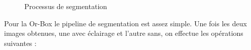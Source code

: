 \begin{figure}[H]
{        \label{Segmentation_Dilatation}
    }
    \caption{Processus de segmentation}
    \label{segfig}
\end{figure}

Pour la Or-Box le pipeline de segmentation est assez simple.
Une fois les deux images obtenues, une avec éclairage et l’autre sans, on effectue les opérations suivantes :

